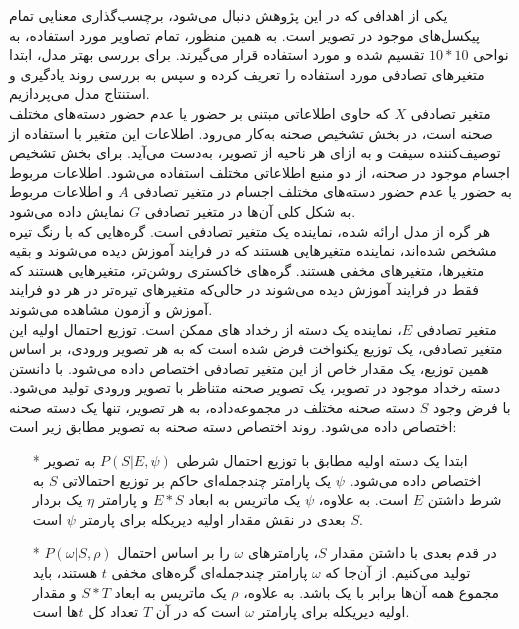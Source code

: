 \begin{enumerate}
یکی از اهدافی که در این پژوهش دنبال می‌شود، برچسب‌گذاری معنایی تمام پیکسل‌های موجود در تصویر است. به همین منظور، تمام تصاویر مورد استفاده، به نواحی $10 * 10$ تقسیم شده و مورد استفاده قرار می‌گیرند. برای بررسی بهتر مدل، ابتدا متغیرهای تصادفی مورد استفاده را تعریف کرده و سپس به بررسی روند یادگیری و استنتاج مدل می‌پردازیم.
\\
متغیر تصادفی $X$ که حاوی اطلاعاتی مبتنی بر حضور یا عدم حضور دسته‌های مختلف صحنه است، در بخش تشخیص صحنه به‌کار می‌رود. اطلاعات این متغیر با استفاده از توصیف‌کننده سیفت و به ازای هر ناحیه از تصویر، به‌دست می‌آید. برای بخش تشخیص اجسام موجود در صحنه، از دو منبع اطلاعاتی مختلف استفاده می‌شود. اطلاعات مربوط به حضور یا عدم حضور دسته‌های مختلف اجسام در متغیر تصادفی $A$ و اطلاعات مربوط به شکل کلی آن‌ها در متغیر تصادفی $G$ نمایش داده‌ می‌شود.
\\
هر گره از مدل ارائه شده، نماینده یک متغیر تصادفی است. گره‌هایی که با رنگ تیره مشخص شده‌اند، نماینده متغیرهایی هستند که در فرایند آموزش دیده می‌شوند و بقیه متغیرها، متغیرهای مخفی هستند. گره‌های خاکستری روشن‌تر، متغیرهایی هستند که فقط در فرایند آموزش دیده‌ می‌شوند در حالی‌که متغیرهای تیره‌تر در هر دو فرایند آموزش و آزمون مشاهده می‌شوند.
\\
متغیر تصادفی $E$، نماینده یک دسته‌ از رخداد
های ممکن است. توزیع احتمال اولیه این متغیر  تصادفی، یک توزیع یکنواخت فرض شده است که به هر تصویر ورودی، بر اساس همین توزیع، یک مقدار خاص از این متغیر تصادفی اختصاص داده می‌شود. با دانستن دسته رخداد موجود در تصویر، یک تصویر صحنه متناظر با تصویر ورودی تولید می‌شود. با فرض وجود $S$ دسته صحنه مختلف در مجموعه‌داده، به هر تصویر، تنها یک دسته صحنه اختصاص داده می‌شود. روند اختصاص دسته صحنه به تصویر مطابق زیر است:
\begin{itemize}
\item[*]
ابتدا یک دسته اولیه مطابق با توزیع احتمال شرطی 
$P(S|E, \psi)$
به تصویر اختصاص داده می‌شود. $\psi$ یک پارامتر چندجمله‌ای
 حاکم بر توزیع احتمالاتی $S$ به شرط داشتن $E$ است. به علاوه، $\psi$ یک ماتریس به ابعاد $E * S$ و پارامتر $\eta$ یک بردار $S$ بعدی در نقش مقدار اولیه دیریکله
 برای پارمتر $\psi$ است.
\item[*]
در قدم بعدی با داشتن مقدار $S$، پارامترهای $\omega$ را بر اساس احتمال 
$P(\omega|S, \rho)$
تولید می‌کنیم. از آن‌جا که $\omega$ پارامتر چندجمله‌ای گره‌های مخفی $t$ هستند، باید مجموع همه آن‌ها برابر با یک باشد. به علاوه، $\rho$ یک ماتریس به ابعاد $S * T$ و مقدار اولیه دیریکله برای پارامتر $\omega$ است که در آن $T$ تعداد کل $t$ها است.

\end{itemize}
\end{enumerate}
